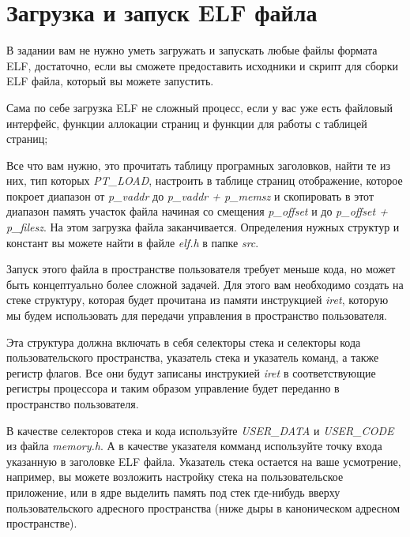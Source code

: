 \section{Загрузка и запуск ELF файла}

В задании вам не нужно уметь загружать и запускать любые файлы формата ELF,
достаточно, если вы сможете предоставить исходники и скрипт для сборки ELF
файла, который вы можете запустить.

Сама по себе загрузка ELF не сложный процесс, если у вас уже есть файловый
интерфейс, функции аллокации страниц и функции для работы с таблицей
страниц;

Все что вам нужно, это прочитать таблицу програмных заголовков, найти те
из них, тип которых \emph{PT\_LOAD}, настроить в таблице страниц отображение,
которое покроет диапазон от \emph{p\_vaddr} до \emph{p\_vaddr + p\_memsz} и
скопировать в этот диапазон память участок файла начиная со смещения
\emph{p\_offset} и до \emph{p\_offset + p\_filesz}. На этом загрузка файла
заканчивается. Определения нужных структур и констант вы можете найти в файле
\emph{elf.h} в папке \emph{src}.

Запуск этого файла в пространстве пользователя требует меньше кода, но
может быть концептуально более сложной задачей. Для этого вам необходимо
создать на стеке структуру, которая будет прочитана из памяти инструкцией
\emph{iret}, которую мы будем использовать для передачи управления в
пространство пользователя.

Эта структура должна включать в себя селекторы стека и селекторы кода
пользовательского пространства, указатель стека и указатель команд, а также
регистр флагов. Все они будут записаны инструкией \emph{iret} в
соответствующие регистры процессора и таким образом управление будет
переданно в пространство пользователя.

В качестве селекторов стека и кода используйте \emph{USER\_DATA} и
\emph{USER\_CODE} из файла \emph{memory.h}. А в качестве указателя комманд
используйте точку входа указанную в заголовке ELF файла. Указатель стека
остается на ваше усмотрение, например, вы можете возложить настройку стека
на пользовательское приложение, или в ядре выделить память под стек где-нибудь
вверху пользовательского адресного пространства (ниже дыры в каноническом
адресном пространстве).
